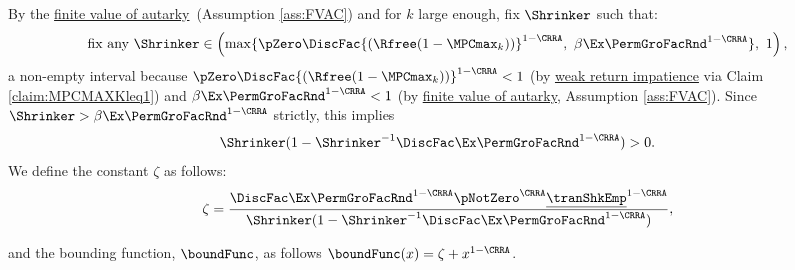 \documentclass[\econtexRoot/BufferStockTheory]{subfiles}
\begin{document}
\begin{remark}\label{rem:shnkrdef}
By the \hyperlink{FVAC}{finite value of autarky}~(Assumption \ref{ass:FVAC}) and for $k$ large enough, fix $\Shrinker$ such that:
%
\begin{equation}\label{eq:shnkrdef}
\text{fix any } \Shrinker \in \left(\max\{\pZero \DiscFac {(\Rfree (1-\MPCmax_{k}))}^{1-\CRRA},\ \beta\Ex\PermGroFacRnd^{1-\CRRA}\},\ 1\right),
\end{equation}
%
a non-empty interval because $\pZero \DiscFac {(\Rfree (1-\MPCmax_{k}))}^{1-\CRRA}<1$ (by \hyperlink{WRIC}{weak return impatience} via Claim \ref{claim:MPCMAXKleq1}) and $\beta\Ex\PermGroFacRnd^{1-\CRRA}<1$ (by \hyperlink{FVAC}{finite value of autarky}, Assumption \ref{ass:FVAC}).
Since $\Shrinker>\beta\Ex\PermGroFacRnd^{1-\CRRA}$ strictly, this implies
%
\begin{equation}\label{eq:shrnkrCond}
\Shrinker(1- \Shrinker^{-1}\DiscFac \Ex\PermGroFacRnd^{1-\CRRA })>0.
\end{equation}
%
We define the constant $\zeta$ as follows:
%
\begin{equation}\label{eq:Mbarddef}
\zeta = \frac{\DiscFac \Ex \PermGroFacRnd^{1-\CRRA }\pNotZero^{\CRRA}\underline{\tranShkEmp}^{1-\CRRA}}{\Shrinker(1- \Shrinker^{-1}\DiscFac \Ex \PermGroFacRnd^{1-\CRRA })}, 
\end{equation}

and the bounding function, $\boundFunc$, as follows $\boundFunc(x) = \zeta +  x^{1-\CRRA}$.


\end{remark}
\end{document}
